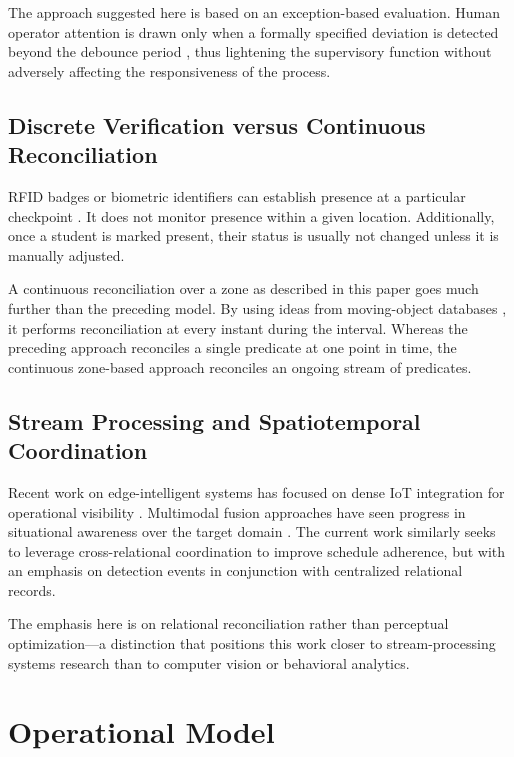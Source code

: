 \documentclass[conference]{IEEEtran}
\begin{document}
The approach suggested here is based on an exception-based evaluation. Human operator attention is drawn only when a formally specified deviation is detected beyond the debounce period \cite{b17}, thus lightening the supervisory function without adversely affecting the responsiveness of the process.

\subsection{Discrete Verification versus Continuous Reconciliation}
RFID badges or biometric identifiers can establish presence at a particular checkpoint \cite{b2, b3}. It does not monitor presence within a given location. Additionally, once a student is marked present, their status is usually not changed unless it is manually adjusted.

A continuous reconciliation over a zone as described in this paper goes much further than the preceding model. By using ideas from moving-object databases \cite{b15, b16}, it performs reconciliation at every instant during the interval. Whereas the preceding approach reconciles a single predicate at one point in time, the continuous zone-based approach reconciles an ongoing stream of predicates.

\subsection{Stream Processing and Spatiotemporal Coordination}
Recent work on edge-intelligent systems has focused on dense IoT integration for operational visibility \cite{b1}. Multimodal fusion approaches have seen progress in situational awareness over the target domain \cite{b6}. The current work similarly seeks to leverage cross-relational coordination to improve schedule adherence, but with an emphasis on detection events \cite{b23} in conjunction with centralized relational records.

The emphasis here is on relational reconciliation rather than perceptual optimization---a distinction that positions this work closer to stream-processing systems research \cite{b22} than to computer vision or behavioral analytics.

\section{Operational Model}
\end{document}
